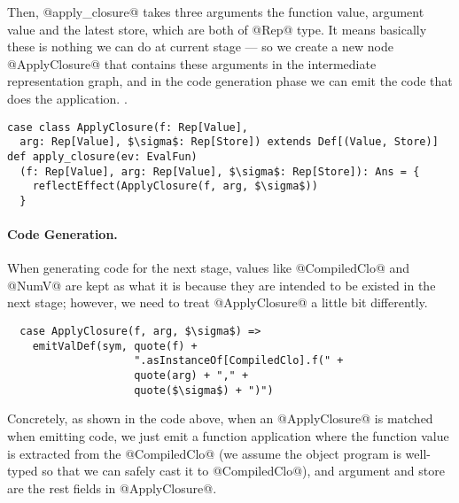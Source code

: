 Then, @apply_closure@ takes three arguments the function value, argument value and the latest store, 
which are both of @Rep@ type. It means basically these is nothing we can do at current stage --- 
so we create a new node @ApplyClosure@ that contains these arguments in the intermediate representation graph,
and in the code generation phase we can emit the code that does the application. .

\begin{lstlisting}
case class ApplyClosure(f: Rep[Value], 
  arg: Rep[Value], $\sigma$: Rep[Store]) extends Def[(Value, Store)]
def apply_closure(ev: EvalFun)
  (f: Rep[Value], arg: Rep[Value], $\sigma$: Rep[Store]): Ans = {
    reflectEffect(ApplyClosure(f, arg, $\sigma$))
  }
\end{lstlisting}

\paragraph{Code Generation.}
When generating code for the next stage, values like @CompiledClo@ and @NumV@ are kept as what it is because
they are intended to be existed in the next stage; however, we need to treat @ApplyClosure@ a little bit 
differently.

\begin{lstlisting}
  case ApplyClosure(f, arg, $\sigma$) => 
    emitValDef(sym, quote(f) + 
                    ".asInstanceOf[CompiledClo].f(" + 
                    quote(arg) + "," + 
                    quote($\sigma$) + ")")
\end{lstlisting}

Concretely, as shown in the code above, when an @ApplyClosure@ is matched when emitting code, we just 
emit a function application where the function value is extracted from the @CompiledClo@
(we assume the object program is well-typed so that we can safely cast it to @CompiledClo@), 
and argument and store are the rest fields in @ApplyClosure@.

